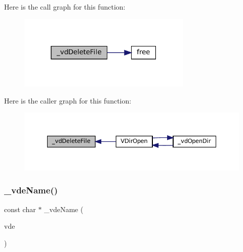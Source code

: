 Here is the call graph for this function\+:
\nopagebreak
\begin{figure}[H]
\begin{center}
\leavevmode
\includegraphics[width=235pt]{vfs-dirent_8c_aa33820d98e66f15533027d25a4aa76ca_cgraph}
\end{center}
\end{figure}
Here is the caller graph for this function\+:
\nopagebreak
\begin{figure}[H]
\begin{center}
\leavevmode
\includegraphics[width=350pt]{vfs-dirent_8c_aa33820d98e66f15533027d25a4aa76ca_icgraph}
\end{center}
\end{figure}
\mbox{\label{vfs-dirent_8c_a13ca1b5e641080df5395524454ec2dd1}} 
\subsubsection{\texorpdfstring{\+\_\+vde\+Name()}{\_vdeName()}}
{\footnotesize\ttfamily const char $\ast$ \+\_\+vde\+Name (\begin{DoxyParamCaption}\item[{struct V\+Dir\+Entry $\ast$}]{vde }\end{DoxyParamCaption})\hspace{0.3cm}{\ttfamily [static]}}

